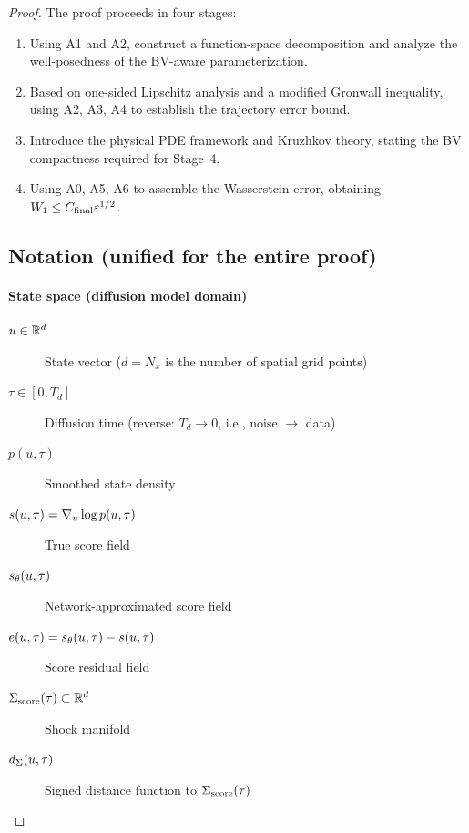 \begin{proof}

The proof proceeds in four stages:
\begin{enumerate}
  \item[Stage~1.] Using A1 and A2, construct a function-space decomposition and analyze the well-posedness of the BV-aware parameterization.
  \item[Stage~2.] Based on one-sided Lipschitz analysis and a modified Gronwall inequality, using A2, A3, A4 to establish the trajectory error bound.
  \item[Stage~3.] Introduce the physical PDE framework and Kruzhkov theory, stating the BV compactness required for Stage~4.
  \item[Stage~4.] Using A0, A5, A6 to assemble the Wasserstein error, obtaining $W_{1} \leq C_{\mathrm{final}} \varepsilon^{1/2}$.
\end{enumerate}

\subsection*{Notation (unified for the entire proof)}\label{sec:notation-proof}

\paragraph{State space (diffusion model domain)}
\begin{description}
  \item[$u \in \mathbb{R}^d$] State vector ($d = N_x$ is the number of spatial grid points)
  \item[{$\tau \in [0, T_d]$}] Diffusion time (reverse: $T_d \to 0$, i.e., noise $\to$ data)
  \item[$p(u, \tau)$] Smoothed state density
  \item[$s(u, \tau) = \nabla_u \log p(u, \tau)$] True score field
  \item[$s_{\theta}(u, \tau)$] Network-approximated score field
  \item[$e(u, \tau) = s_{\theta}(u, \tau) - s(u, \tau)$] Score residual field
  \item[$\Sigma_{\mathrm{score}}(\tau) \subset \mathbb{R}^d$] Shock manifold
  \item[$d_{\Sigma}(u, \tau)$] Signed distance function to $\Sigma_{\mathrm{score}}(\tau)$
\end{description}


\end{proof}

